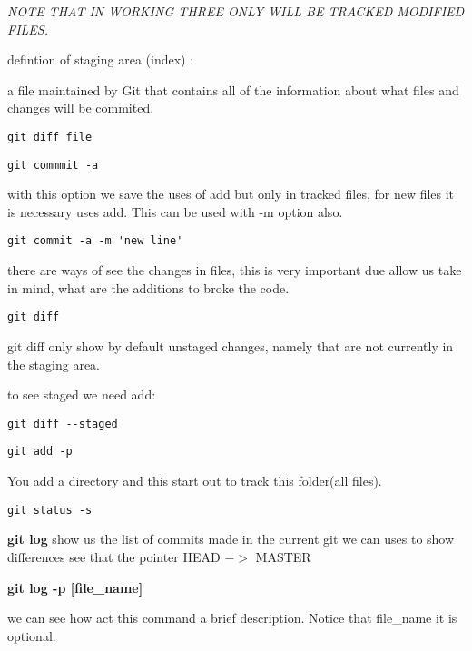 \documentclass[10pt,a4paper]{article}
\begin{document}
\textit{ NOTE THAT IN WORKING THREE ONLY WILL BE TRACKED MODIFIED FILES.}


defintion of staging area (index) :

a file maintained by Git that contains all of the information
about what files and changes will be commited.




\begin{verbatim}
git diff file 
\end{verbatim}




\begin{verbatim}
git commmit -a
\end{verbatim}

with this option we save the uses of add but only in tracked files, for new files it is necessary uses add. This can be used with -m option also.


\begin{verbatim}
git commit -a -m 'new line'
\end{verbatim}


there are ways of see the changes in files, this is very important due allow us take in mind, what are the additions to broke the code.

\begin{verbatim}
git diff
\end{verbatim}

git diff only show by default unstaged changes, namely that are not currently in the staging area.

to see staged we need add:

\begin{verbatim}
git diff --staged 
\end{verbatim}

\begin{verbatim}
git add -p 
\end{verbatim}

You add a directory and this start out to track this folder(all files).

\begin{verbatim}
git status -s
\end{verbatim}

\textbf{git log}
show us the list of commits made in the current git
we can uses to show differences see that the pointer HEAD $->$ MASTER

\textbf{git log -p [file\_name]}

we can see how act this command a brief description.
Notice that file_name it is optional.
\end{document}
